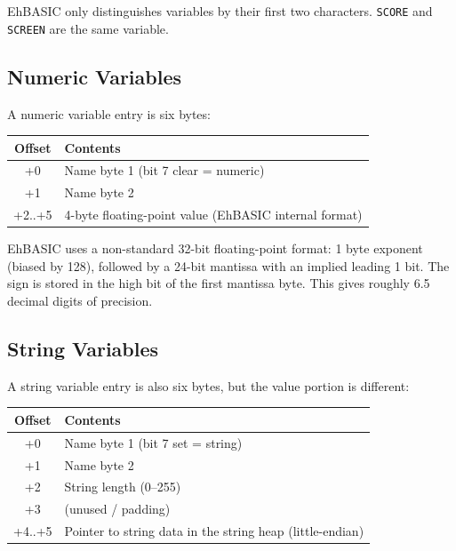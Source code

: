 EhBASIC only distinguishes variables by their first two characters.
\texttt{SCORE} and \texttt{SCREEN} are the same variable.

\subsection{Numeric Variables}

A numeric variable entry is six bytes:

\begin{center}
\begin{tabular}{cl}
\toprule
\textbf{Offset} & \textbf{Contents} \\
\midrule
+0 & Name byte 1 (bit 7 clear = numeric) \\
+1 & Name byte 2 \\
+2..+5 & 4-byte floating-point value (EhBASIC internal format) \\
\bottomrule
\end{tabular}
\end{center}

\begin{notebox}
EhBASIC uses a non-standard 32-bit floating-point format: 1 byte exponent
(biased by 128), followed by a 24-bit mantissa with an implied leading 1 bit.
The sign is stored in the high bit of the first mantissa byte.  This gives
roughly 6.5 decimal digits of precision.
\end{notebox}

\subsection{String Variables}

A string variable entry is also six bytes, but the value portion is
different:

\begin{center}
\begin{tabular}{cl}
\toprule
\textbf{Offset} & \textbf{Contents} \\
\midrule
+0 & Name byte 1 (bit 7 set = string) \\
+1 & Name byte 2 \\
+2 & String length (0--255) \\
+3 & (unused / padding) \\
+4..+5 & Pointer to string data in the string heap (little-endian) \\
\bottomrule
\end{tabular}
\end{center}

